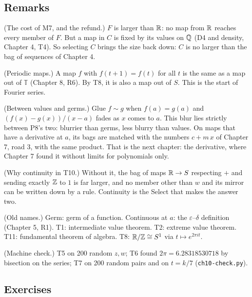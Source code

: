 \subsection*{Remarks}

\begin{lines}
\item[\lab{R1}] (The cost of M7, and the refund.) $F$ is larger than $\mathbb{R}$: no map from $\mathbb{R}$ reaches every member of $F$. But a map in $C$ is fixed by its values on $\mathbb{Q}$ (D4 and density, Chapter 4, T4). So selecting $C$ brings the size back down: $C$ is no larger than the bag of sequences of Chapter 4.
\item[\lab{R2}] (Periodic maps.) A map $f$ with $f(t + 1) = f(t)$ for all $t$ is the same as a map out of $\mathbb{T}$ (Chapter 8, R6). By T8, it is also a map out of $S$. This is the start of Fourier series.
\item[\lab{R3}] (Between values and germs.) Glue $f \sim g$ when $f(a) = g(a)$ and $(f(x) - g(x))/(x - a)$ fades as $x$ comes to $a$. This blur lies strictly between P8's two: blurrier than germs, less blurry than values. On maps that have a derivative at $a$, its bags are matched with the numbers $c + m\,x$ of Chapter 7, road 3, with the same product. That is the next chapter: the derivative, where Chapter 7 found it without limits for polynomials only.
\item[\lab{R4}] (Why continuity in T10.) Without it, the bag of maps $\mathbb{R} \to S$ respecting $+$ and sending exactly $\mathbb{Z}$ to $1$ is far larger, and no member other than $w$ and its mirror can be written down by a rule. Continuity is the Select that makes the answer two.
\item[\lab{R5}] (Old names.) Germ: germ of a function. Continuous at $a$: the $\varepsilon$--$\delta$ definition (Chapter 5, R1). T1: intermediate value theorem. T2: extreme value theorem. T11: fundamental theorem of algebra. T8: $\mathbb{R}/\mathbb{Z} \cong S^1$ via $t \mapsto e^{2\pi i t}$.
\item[\lab{R6}] (Machine check.) T5 on 200 random $z, w$; T6 found $2\pi = 6.28318530718$ by bisection on the series; T7 on 200 random pairs and on $t = k/7$ (\texttt{ch10-check.py}).
\end{lines}

\subsection*{Exercises}

